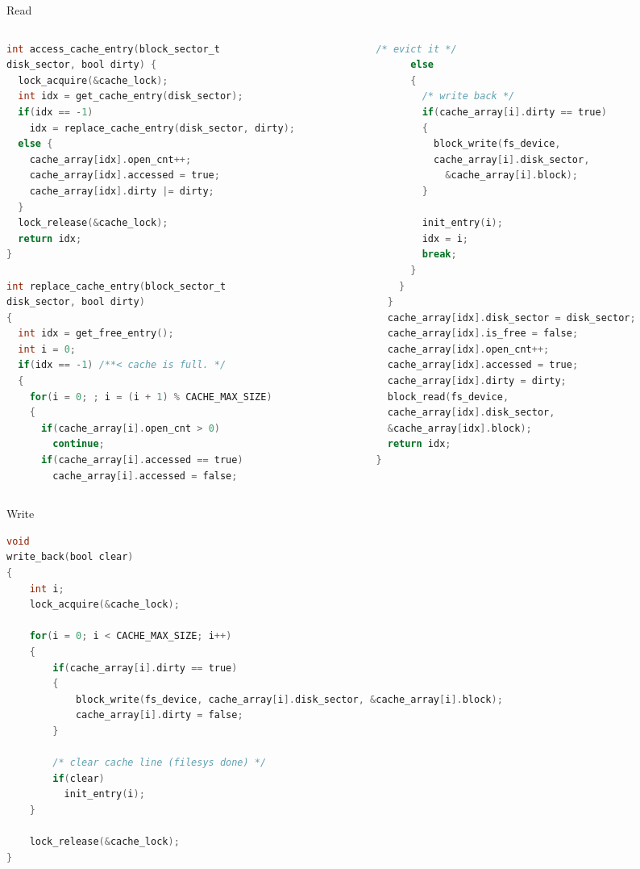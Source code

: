 \documentclass[10pt]{beamer}
\begin{document}
\begin{frame}[fragile]{Read}
\begin{columns}
\begin{column}{0.5\textwidth}
\begin{lstlisting}[language=C]
int access_cache_entry(block_sector_t 
disk_sector, bool dirty) {
  lock_acquire(&cache_lock);
  int idx = get_cache_entry(disk_sector);
  if(idx == -1)
    idx = replace_cache_entry(disk_sector, dirty);
  else {
    cache_array[idx].open_cnt++;
    cache_array[idx].accessed = true;
    cache_array[idx].dirty |= dirty;
  }
  lock_release(&cache_lock);
  return idx;
}

int replace_cache_entry(block_sector_t
disk_sector, bool dirty)
{
  int idx = get_free_entry();
  int i = 0;
  if(idx == -1) /**< cache is full. */
  {
    for(i = 0; ; i = (i + 1) % CACHE_MAX_SIZE)
    {
      if(cache_array[i].open_cnt > 0)
        continue;
      if(cache_array[i].accessed == true)
        cache_array[i].accessed = false;
\end{lstlisting}
\end{column}
\begin{column}{0.5\textwidth}
\begin{lstlisting}[language=C]
  /* evict it */
      else
      {
        /* write back */
        if(cache_array[i].dirty == true)
        {
          block_write(fs_device, 
          cache_array[i].disk_sector,
            &cache_array[i].block);
        }

        init_entry(i);
        idx = i;
        break;
      }
    }
  }
  cache_array[idx].disk_sector = disk_sector;
  cache_array[idx].is_free = false;
  cache_array[idx].open_cnt++;
  cache_array[idx].accessed = true;
  cache_array[idx].dirty = dirty;
  block_read(fs_device,
  cache_array[idx].disk_sector, 
  &cache_array[idx].block);
  return idx;
}
\end{lstlisting}
\end{column}
\end{columns}
\end{frame}
\begin{frame}[fragile]{Write}
\begin{lstlisting}[language=C]
void 
write_back(bool clear)
{
    int i;
    lock_acquire(&cache_lock);

    for(i = 0; i < CACHE_MAX_SIZE; i++)
    {
        if(cache_array[i].dirty == true)
        {
            block_write(fs_device, cache_array[i].disk_sector, &cache_array[i].block);
            cache_array[i].dirty = false;
        }

        /* clear cache line (filesys done) */
        if(clear) 
          init_entry(i);
    }

    lock_release(&cache_lock);
}
\end{lstlisting}
\end{frame}
\end{document}
